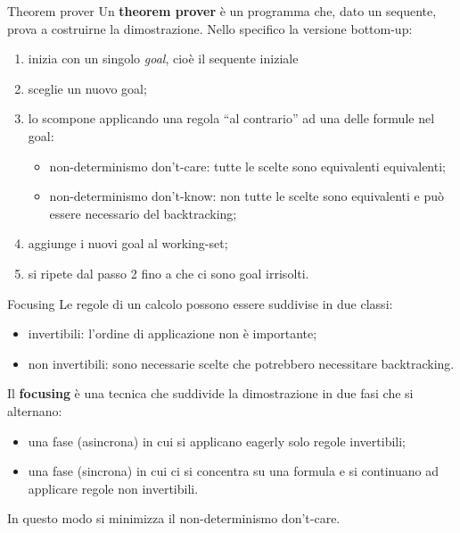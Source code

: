 \documentclass{beamer}
\begin{document}
\begin{frame}{Theorem prover}
	Un \textbf{theorem prover} è un programma che, dato un sequente, prova a costruirne la dimostrazione.
	Nello specifico la versione bottom-up:
	\begin{enumerate}
		\item inizia con un singolo \textit{goal}, cioè il sequente iniziale
		\item sceglie un nuovo goal;
		\item lo scompone applicando una regola ``al contrario'' ad una delle formule nel goal:
			\begin{itemize}
				\item non-determinismo don't-care: tutte le scelte sono equivalenti equivalenti;
				\item non-determinismo don't-know: non tutte le scelte sono equivalenti e può essere necessario del backtracking;
			\end{itemize}
		\item aggiunge i nuovi goal al working-set;
		\item si ripete dal passo 2 fino a che ci sono goal irrisolti.
	\end{enumerate}
\end{frame}

\begin{frame}{Focusing}
	Le regole di un calcolo possono essere suddivise in due classi:
	\begin{itemize}
		\item invertibili: l'ordine di applicazione non è importante;
		\item non invertibili: sono necessarie scelte che potrebbero necessitare backtracking.
	\end{itemize}
	Il \textbf{focusing} è una tecnica che suddivide la dimostrazione in due fasi che si alternano:
	\begin{itemize}
		\item una fase (asincrona) in cui si applicano eagerly solo regole invertibili;
		\item una fase (sincrona) in cui ci si concentra su una formula e si continuano ad applicare regole non invertibili.
	\end{itemize}
	In questo modo si minimizza il non-determinismo don't-care.
\end{frame}
\end{document}
